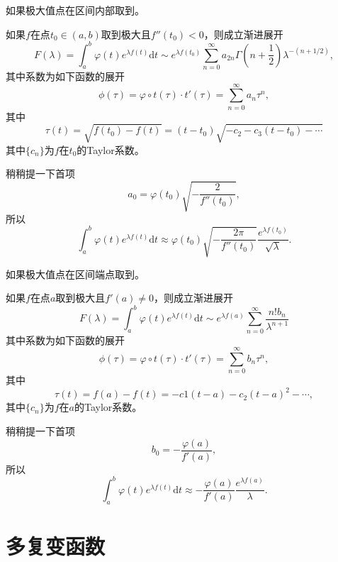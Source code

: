 如果极大值点在区间内部取到。
\begin{thm}
如果$f$在点$t_0\in(a,b)$取到极大且$f''(t_0)<0$，则成立渐进展开
\[
F(\lambda)=\int_a^b \varphi(t) e^{\lambda f(t)} \mathrm{d}t \sim e^{\lambda f(t_0)}\sum_{n=0}^\infty a_{2n}
\Gamma\left(n+\frac{1}{2}\right)\lambda^{-(n+1/2)},
\]
其中系数为如下函数的展开
\[
\phi(\tau)=\varphi \circ t(\tau)\cdot t'(\tau)=\sum_{n=0}^\infty a_n\tau^n,
\]
其中
\[
\tau(t)=\sqrt{f(t_0)-f(t)}=(t-t_0)\sqrt{-c_2-c_3(t-t_0)-\cdots}
\]
其中$\{c_n\}$为$f$在$t_0$的Taylor系数。

稍稍提一下首项
\[
a_0=\varphi(t_0)\sqrt{-\frac{2}{f''(t_0)}},
\]
所以
\[
\int_a^b \varphi(t) e^{\lambda f(t)} \mathrm{d}t \approx \varphi(t_0)\sqrt{-\frac{2\pi}{f''(t_0)}}
\frac{e^{\lambda f(t_0)}}{\sqrt{\lambda}}.
\]
\end{thm}
如果极大值点在区间端点取到。
\begin{thm}
如果$f$在点$a$取到极大且$f'(a)\neq 0$，则成立渐进展开
\[
F(\lambda)=\int_a^b \varphi(t) e^{\lambda f(t)} \mathrm{d}t \sim e^{\lambda f(a)}\sum_{n=0}^\infty 
\frac{n!b_n}{\lambda^{n+1}}
\]
其中系数为如下函数的展开
\[
\phi(\tau)=\varphi \circ t(\tau)\cdot t'(\tau)=\sum_{n=0}^\infty b_n\tau^n,
\]
其中
\[
\tau(t) =f(a)-f(t)=-c1(t-a)-c_2(t-a)^2-\cdots,
\]
其中$\{c_n\}$为$f$在$a$的Taylor系数。

稍稍提一下首项
\[
b_0=-\frac{\varphi(a)}{f'(a)},
\]
所以
\[
\int_a^b \varphi(t) e^{\lambda f(t)} \mathrm{d}t \approx -\frac{\varphi(a)}{f'(a)}\frac{e^{\lambda f(a)}}{\lambda}.
\]
\end{thm}

\section{多复变函数}